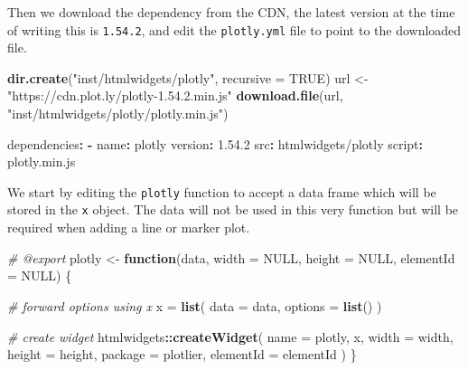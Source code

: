 \documentclass[
]{krantz}
\makeatletter
\newenvironment{Shaded}{\begin{snugshade}}{\end{snugshade}}
\newcommand{\AttributeTok}[1]{\textcolor[rgb]{0.61,0.61,0.61}{#1}}
\newcommand{\CommentTok}[1]{\textcolor[rgb]{0.37,0.37,0.37}{\textit{#1}}}
\newcommand{\ControlFlowTok}[1]{\textcolor[rgb]{0.27,0.27,0.27}{\textbf{#1}}}
\newcommand{\DataTypeTok}[1]{\textcolor[rgb]{0.27,0.27,0.27}{#1}}
\newcommand{\FloatTok}[1]{\textcolor[rgb]{0.06,0.06,0.06}{#1}}
\newcommand{\FunctionTok}[1]{\textcolor[rgb]{0,0,0}{#1}}
\newcommand{\KeywordTok}[1]{\textcolor[rgb]{0.27,0.27,0.27}{\textbf{#1}}}
\newcommand{\NormalTok}[1]{#1}
\newcommand{\OperatorTok}[1]{\textcolor[rgb]{0.43,0.43,0.43}{\textbf{#1}}}
\newcommand{\OtherTok}[1]{\textcolor[rgb]{0.37,0.37,0.37}{#1}}
\newcommand{\StringTok}[1]{\textcolor[rgb]{0.5,0.5,0.5}{#1}}
\newenvironment{kframe}{%
\medskip{}
\setlength{\fboxsep}{.8em}
 \def\at@end@of@kframe{}%
 \ifinner\ifhmode%
  \def\at@end@of@kframe{\end{minipage}}%
  \begin{minipage}{\columnwidth}%
 \fi\fi%
 \def\FrameCommand##1{\hskip\@totalleftmargin \hskip-\fboxsep
 \colorbox{shadecolor}{##1}\hskip-\fboxsep
     \hskip-\linewidth \hskip-\@totalleftmargin \hskip\columnwidth}%
 \MakeFramed {\advance\hsize-\width
   \@totalleftmargin\z@ \linewidth\hsize
   \@setminipage}}%
 {\par\unskip\endMakeFramed%
 \at@end@of@kframe}
\renewenvironment{Shaded}{\begin{kframe}}{\end{kframe}}
\makeatother
\begin{document}
Then we download the dependency from the CDN, the latest version at the time of writing this is \texttt{1.54.2}, and edit the \texttt{plotly.yml} file to point to the downloaded file.

\begin{Shaded}
\begin{Highlighting}[]
\KeywordTok{dir.create}\NormalTok{(}\StringTok{"inst/htmlwidgets/plotly"}\NormalTok{, }\DataTypeTok{recursive =} \OtherTok{TRUE}\NormalTok{)}
\NormalTok{url <{-}}\StringTok{ "https://cdn.plot.ly/plotly{-}1.54.2.min.js"}
\KeywordTok{download.file}\NormalTok{(url, }\StringTok{"inst/htmlwidgets/plotly/plotly.min.js"}\NormalTok{)}
\end{Highlighting}
\end{Shaded}

\begin{Shaded}
\begin{Highlighting}[]
\FunctionTok{dependencies}\KeywordTok{:}
\AttributeTok{ }\KeywordTok{{-}}\AttributeTok{ }\FunctionTok{name}\KeywordTok{:}\AttributeTok{ plotly}
\AttributeTok{   }\FunctionTok{version}\KeywordTok{:}\AttributeTok{ }\FloatTok{1.54.2}
\AttributeTok{   }\FunctionTok{src}\KeywordTok{:}\AttributeTok{ htmlwidgets/plotly}
\AttributeTok{   }\FunctionTok{script}\KeywordTok{:}\AttributeTok{ plotly.min.js}
\end{Highlighting}
\end{Shaded}

We start by editing the \texttt{plotly} function to accept a data frame which will be stored in the \texttt{x} object. The data will not be used in this very function but will be required when adding a line or marker plot.

\begin{Shaded}
\begin{Highlighting}[]
\CommentTok{\#\textquotesingle{} @export}
\NormalTok{plotly <{-}}\StringTok{ }\ControlFlowTok{function}\NormalTok{(data, }\DataTypeTok{width =} \OtherTok{NULL}\NormalTok{, }\DataTypeTok{height =} \OtherTok{NULL}\NormalTok{, }
  \DataTypeTok{elementId =} \OtherTok{NULL}\NormalTok{) \{}

  \CommentTok{\# forward options using x}
\NormalTok{  x =}\StringTok{ }\KeywordTok{list}\NormalTok{(}
    \DataTypeTok{data =}\NormalTok{ data,}
    \DataTypeTok{options =} \KeywordTok{list}\NormalTok{()}
\NormalTok{  )}

  \CommentTok{\# create widget}
\NormalTok{  htmlwidgets}\OperatorTok{::}\KeywordTok{createWidget}\NormalTok{(}
    \DataTypeTok{name =} \StringTok{\textquotesingle{}plotly\textquotesingle{}}\NormalTok{,}
\NormalTok{    x,}
    \DataTypeTok{width =}\NormalTok{ width,}
    \DataTypeTok{height =}\NormalTok{ height,}
    \DataTypeTok{package =} \StringTok{\textquotesingle{}plotlier\textquotesingle{}}\NormalTok{,}
    \DataTypeTok{elementId =}\NormalTok{ elementId}
\NormalTok{  )}
\NormalTok{\}}
\end{Highlighting}
\end{Shaded}
\end{document}
